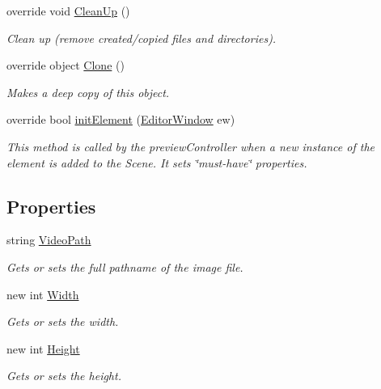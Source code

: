 \begin{DoxyCompactItemize}
override void \hyperlink{class_a_rdev_kit_1_1_model_1_1_project_1_1_video_augmentation_a83390b8765641d1626b23a06c54490af}{Clean\-Up} ()
\begin{DoxyCompactList}\small\item\em Clean up (remove created/copied files and directories). \end{DoxyCompactList}\item 
override object \hyperlink{class_a_rdev_kit_1_1_model_1_1_project_1_1_video_augmentation_a1c99b0002e89662c75ae59031f1f7ec5}{Clone} ()
\begin{DoxyCompactList}\small\item\em Makes a deep copy of this object. \end{DoxyCompactList}\item 
override bool \hyperlink{class_a_rdev_kit_1_1_model_1_1_project_1_1_video_augmentation_afb33f9a8ac2591973d29ebd56bd75da5}{init\-Element} (\hyperlink{class_a_rdev_kit_1_1_editor_window}{Editor\-Window} ew)
\begin{DoxyCompactList}\small\item\em This method is called by the preview\-Controller when a new instance of the element is added to the Scene. It sets \char`\"{}must-\/have\char`\"{} properties. \end{DoxyCompactList}\end{DoxyCompactItemize}
\subsection*{Properties}
\begin{DoxyCompactItemize}
\item 
string \hyperlink{class_a_rdev_kit_1_1_model_1_1_project_1_1_video_augmentation_adf603b3ae112358e8cae761e94003de1}{Video\-Path}
\begin{DoxyCompactList}\small\item\em Gets or sets the full pathname of the image file. \end{DoxyCompactList}\item 
new int \hyperlink{class_a_rdev_kit_1_1_model_1_1_project_1_1_video_augmentation_aad5c2b8555dfe2fd18f2c67c7f34bbda}{Width}
\begin{DoxyCompactList}\small\item\em Gets or sets the width. \end{DoxyCompactList}\item 
new int \hyperlink{class_a_rdev_kit_1_1_model_1_1_project_1_1_video_augmentation_accd9c0cc7875d689b73306a38892b4fe}{Height}
\begin{DoxyCompactList}\small\item\em Gets or sets the height. \end{DoxyCompactList}\end{DoxyCompactItemize}
